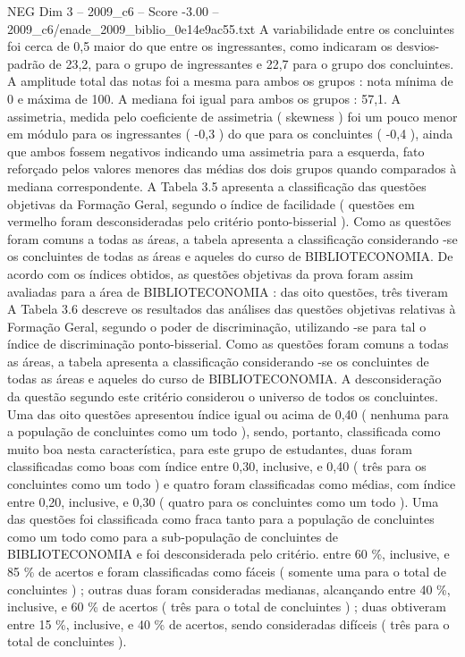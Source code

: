 \begin{textsample}{NEG Dim 3 – 2009\_c6 – Score -3.00 – 2009\_c6/enade\_2009\_biblio\_0e14e9ac55.txt}
A variabilidade entre os concluintes foi cerca de 0,5 maior do que entre os ingressantes, como indicaram os desvios-padrão de 23,2, para o grupo de ingressantes e 22,7 para o grupo dos concluintes.
A amplitude total das notas foi a mesma para ambos os grupos : nota mínima de 0 e máxima de 100.
A mediana foi igual para ambos os grupos : 57,1.
A assimetria, medida pelo coeficiente de assimetria ( skewness ) foi um pouco menor em módulo para os ingressantes ( -0,3 ) do que para os concluintes ( -0,4 ), ainda que ambos fossem negativos indicando uma assimetria para a esquerda, fato reforçado pelos valores menores das médias dos dois grupos quando comparados à mediana correspondente.
A Tabela 3.5 apresenta a classificação das questões objetivas da Formação Geral, segundo o índice de facilidade ( questões em vermelho foram desconsideradas pelo critério ponto-bisserial ).
Como as questões foram comuns a todas as áreas, a tabela apresenta a classificação considerando -se os concluintes de todas as áreas e aqueles do curso de BIBLIOTECONOMIA.
De acordo com os índices obtidos, as questões objetivas da prova foram assim avaliadas para a área de BIBLIOTECONOMIA : das oito questões, três tiveram A Tabela 3.6 descreve os resultados das análises das questões objetivas relativas à Formação Geral, segundo o poder de discriminação, utilizando -se para tal o índice de discriminação ponto-bisserial.
Como as questões foram comuns a todas as áreas, a tabela apresenta a classificação considerando -se os concluintes de todas as áreas e aqueles do curso de BIBLIOTECONOMIA.
A desconsideração da questão segundo este critério considerou o universo de todos os concluintes.
Uma das oito questões apresentou índice igual ou acima de 0,40 ( nenhuma para a população de concluintes como um todo ), sendo, portanto, classificada como muito boa nesta característica, para este grupo de estudantes, duas foram classificadas como boas com índice entre 0,30, inclusive, e 0,40 ( três para os concluintes como um todo ) e quatro foram classificadas como médias, com índice entre 0,20, inclusive, e 0,30 ( quatro para os concluintes como um todo ).
Uma das questões foi classificada como fraca tanto para a população de concluintes como um todo como para a sub-população de concluintes de BIBLIOTECONOMIA e foi desconsiderada pelo critério. entre 60 \%, inclusive, e 85 \% de acertos e foram classificadas como fáceis ( somente uma para o total de concluintes ) ; outras duas foram consideradas medianas, alcançando entre 40 \%, inclusive, e 60 \% de acertos ( três para o total de concluintes ) ; duas obtiveram entre 15 \%, inclusive, e 40 \% de acertos, sendo consideradas difíceis ( três para o total de concluintes ).

\end{textsample}
